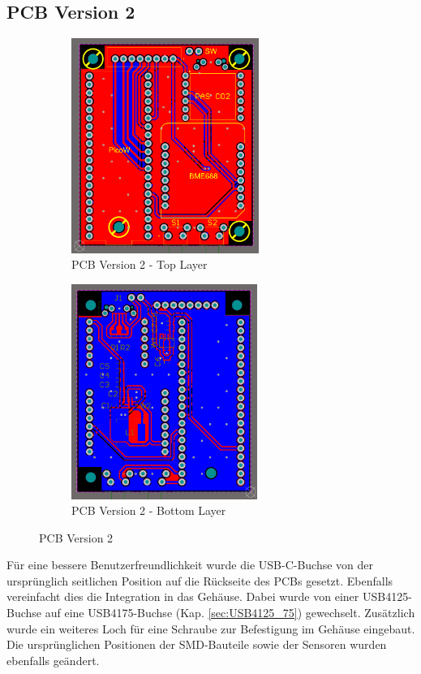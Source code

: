 \begin{inhalt}
  
\section{PCB Version 2} \label{sec:PCBVersion2}


   \begin{figure}[H] 
  \centering
  \begin{subfigure}[b]{0.48\textwidth}
    \centering
    \includegraphics[height=7cm]{files/Tobias/pics/Schaltungen/PCB/Version2_Top.PNG}
    \caption{PCB Version 2 - Top Layer}
    \label{fig:PCB_Version2_Top}
  \end{subfigure}
  \hfill
  \begin{subfigure}[b]{0.48\textwidth}
    \centering
    \includegraphics[height=7cm]{files/Tobias/pics/Schaltungen/PCB/Version2_Bottom.PNG}
    \caption{PCB Version 2 - Bottom Layer}
    \label{fig:PCB_Version2_Bot}
  \end{subfigure}
  \caption{PCB Version 2}
  \label{fig:PCB_Version_2}
\end{figure}

Für eine bessere Benutzerfreundlichkeit wurde die USB-C-Buchse von der ursprünglich seitlichen Position auf die Rückseite des PCBs gesetzt. Ebenfalls vereinfacht dies die Integration in das Gehäuse. Dabei wurde von einer USB4125-Buchse auf eine USB4175-Buchse (Kap. \ref{sec:USB4125_75}) gewechselt. Zusätzlich wurde ein weiteres Loch für eine Schraube zur Befestigung im Gehäuse eingebaut. Die ursprünglichen Positionen der SMD-Bauteile sowie der Sensoren wurden ebenfalls geändert.


\end{inhalt}
